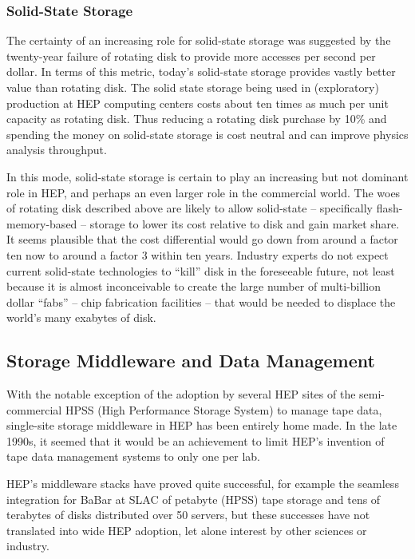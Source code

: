 \subsubsection{Solid-State Storage}
The certainty of an increasing role for solid-state storage was suggested by 
the twenty-year failure of rotating disk to provide more accesses per second 
per dollar.  In terms of this metric, today’s solid-state storage provides 
vastly better value than rotating disk.  The solid state storage being used 
in (exploratory) production at HEP computing centers costs about ten times as 
much per unit capacity as rotating disk.  Thus reducing a rotating disk purchase 
by 10\% and spending the money on solid-state storage is cost neutral and can 
improve physics analysis throughput.

In this mode, solid-state storage is certain to play an increasing but not 
dominant role in HEP, and perhaps an even larger role in the commercial world.  
The woes of rotating disk described above are likely to allow solid-state – 
specifically flash-memory-based – storage to lower its cost relative to disk 
and gain market share.  It seems plausible that the cost differential would 
go down from around a factor ten now to around a factor 3 within ten years.  
Industry experts do not expect current solid-state technologies to “kill” disk 
in the foreseeable future, not least because it is almost inconceivable to 
create the large number of multi-billion dollar “fabs” – chip fabrication 
facilities – that would be needed to displace the world’s many exabytes of disk.

\subsection{Storage Middleware and Data Management}
With the notable exception of the adoption by several HEP sites of the 
semi-commercial HPSS (High Performance Storage System) to manage tape data, 
single-site storage middleware in HEP has been entirely home made.  In the 
late 1990s, it seemed that it would be an achievement to limit HEP’s invention 
of tape data management systems to only one per lab.

HEP’s middleware stacks have proved quite successful, for example the seamless 
integration for BaBar at SLAC of petabyte (HPSS) tape storage and tens of terabytes 
of disks distributed over 50 servers, but these successes have not translated into 
wide HEP adoption, let alone interest by other sciences or industry. 

